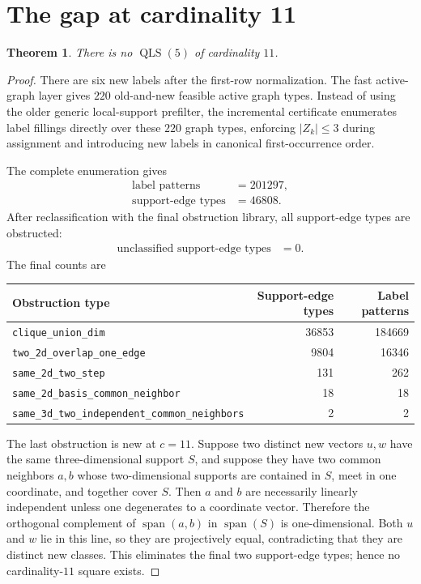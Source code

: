 \documentclass[11pt]{article}
\newtheorem{theorem}{Theorem}
\newcommand{\QLS}{\operatorname{QLS}}
\newcommand{\Span}{\operatorname{span}}
\begin{document}
\section{The gap at cardinality 11}
\label{sec:c11}

\begin{theorem}
There is no \(\QLS(5)\) of cardinality \(11\).
\end{theorem}

\begin{proof}
There are six new labels after the first-row normalization.  The fast
active-graph layer gives \(220\) old-and-new feasible active graph types.
Instead of using the older generic local-support prefilter, the incremental
certificate enumerates label fillings directly over these \(220\) graph types,
enforcing \(|Z_k|\le 3\) during assignment and introducing new labels in
canonical first-occurrence order.

The complete enumeration gives
\[
\begin{array}{rl}
\text{label patterns} &= 201297,\\
\text{support-edge types} &= 46808.
\end{array}
\]
After reclassification with the final obstruction library, all support-edge
types are obstructed:
\[
\begin{array}{rl}
\text{unclassified support-edge types} &= 0.
\end{array}
\]
The final counts are
\begin{center}
\begin{tabular}{lrr}
\toprule
Obstruction type & Support-edge types & Label patterns \\
\midrule
\texttt{clique\_union\_dim} & 36853 & 184669 \\
\texttt{two\_2d\_overlap\_one\_edge} & 9804 & 16346 \\
\texttt{same\_2d\_two\_step} & 131 & 262 \\
\texttt{same\_2d\_basis\_common\_neighbor} & 18 & 18 \\
\texttt{same\_3d\_two\_independent\_common\_neighbors} & 2 & 2 \\
\bottomrule
\end{tabular}
\end{center}

The last obstruction is new at \(c=11\).  Suppose two distinct new vectors
\(u,w\) have the same three-dimensional support \(S\), and suppose they have
two common neighbors \(a,b\) whose two-dimensional supports are contained in
\(S\), meet in one coordinate, and together cover \(S\).  Then \(a\) and \(b\)
are necessarily linearly independent unless one degenerates to a coordinate
vector.  Therefore the orthogonal complement of \(\Span(a,b)\) in
\(\Span(S)\) is one-dimensional.  Both \(u\) and \(w\) lie in this line, so
they are projectively equal, contradicting that they are distinct new classes.
This eliminates the final two support-edge types; hence no cardinality-\(11\)
square exists.
\end{proof}
\end{document}
